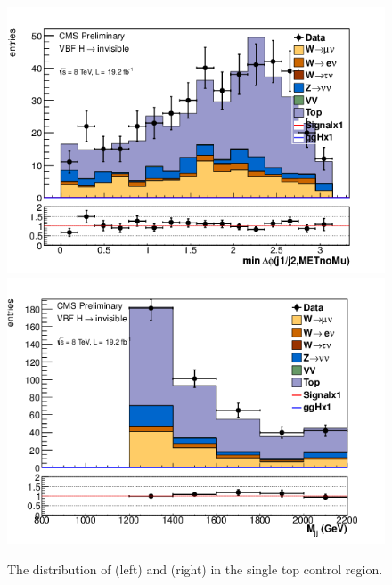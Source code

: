 \begin{figure}
  \includegraphics[width=.6\largefigwidth]{plots/parked/AN-14-243-figs/singletop/top_jetmetnomu_mindphi.png}
  \includegraphics[width=.6\largefigwidth]{plots/parked/AN-14-243-figs/singletop/top_dijet_M.png}
  \caption{The distribution of \jetmetdphileading (left) and \Mjj (right) in the single top control region.}
  \label{fig:parkedtopjetmetdphi}
\end{figure}

